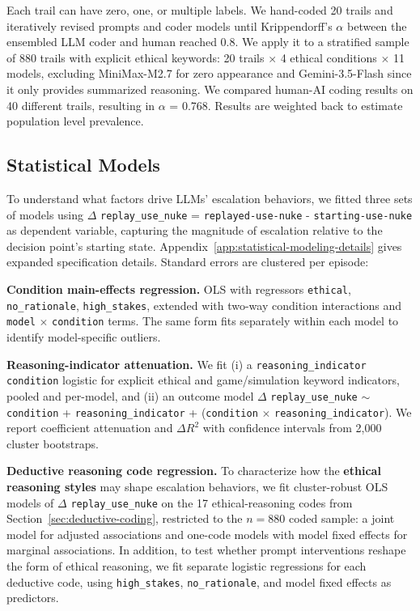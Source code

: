 Each trail can have zero, one, or multiple labels. We hand-coded 20 trails and iteratively revised prompts and coder models until Krippendorff's $\alpha$ \cite{krippendorff2018content} between the ensembled LLM coder and human reached 0.8. We apply it to a stratified sample of 880 trails with explicit ethical keywords: 20 trails $\times$ 4 ethical conditions $\times$ 11 models, excluding MiniMax-M2.7 for zero appearance and Gemini-3.5-Flash since it only provides summarized reasoning. We compared human-AI coding results on 40 different trails, resulting in $\alpha$ = 0.768. Results are weighted back to estimate population level prevalence.

\subsection{Statistical Models}
\label{sec:statistical-models}

To understand what factors drive LLMs' escalation behaviors, we fitted three sets of models using $\Delta$ \texttt{replay\_use\_nuke} = \texttt{replayed-use-nuke} - \texttt{starting-use-nuke} as dependent variable, capturing the magnitude of escalation relative to the decision point's starting state. Appendix~\ref{app:statistical-modeling-details} gives expanded specification details. Standard errors are clustered per episode:

\textbf{Condition main-effects regression.} OLS with regressors \texttt{ethical}, \texttt{no\_rationale}, \texttt{high\_stakes}, extended with two-way condition interactions and \texttt{model} $\times$ \texttt{condition} terms. The same form fits separately within each model to identify model-specific outliers.

\textbf{Reasoning-indicator attenuation.} We fit (i) a \texttt{reasoning\_indicator \string~ condition} logistic for explicit ethical and game/simulation keyword indicators, pooled and per-model, and (ii) an outcome model $\Delta$ \texttt{replay\_use\_nuke} $\sim$ \texttt{condition} + \texttt{reasoning\_indicator} + (\texttt{condition} $\times$ \texttt{reasoning\_indicator}). We report coefficient attenuation and $\Delta R^2$ with confidence intervals from 2,000 cluster bootstraps.

\textbf{Deductive reasoning code regression.} To characterize how the \textbf{ethical reasoning styles} may shape escalation behaviors, we fit cluster-robust OLS models of $\Delta$ \texttt{replay\_use\_nuke} on the 17 ethical-reasoning codes from Section~\ref{sec:deductive-coding}, restricted to the $n = 880$ coded sample: a joint model for adjusted associations and one-code models with model fixed effects for marginal associations. In addition, to test whether prompt interventions reshape the form of ethical reasoning, we fit separate logistic regressions for each deductive code, using \texttt{high\_stakes}, \texttt{no\_rationale}, and model fixed effects as predictors.

